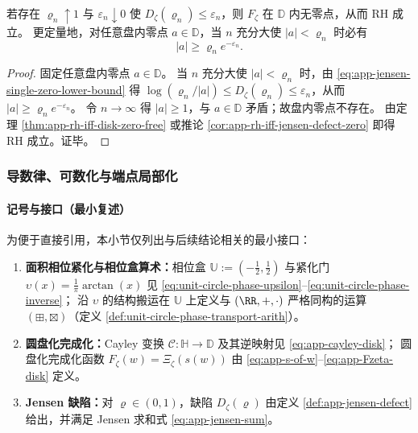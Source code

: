 \begin{corollary}[缺陷上界序列给出的零点排除证书]\label{cor:app-jensen-defect-upperbound-certificate}
若存在 \(\varrho_n\uparrow 1\) 与 \(\varepsilon_n\downarrow 0\) 使 \(D_{\zeta}(\varrho_n)\le \varepsilon_n\)，则 \(F_{\zeta}\) 在 \(\mathbb{D}\) 内无零点，从而 RH 成立。
更定量地，对任意盘内零点 \(a\in\mathbb{D}\)，当 \(n\) 充分大使 \(|a|<\varrho_n\) 时必有
\[
|a|\ge \varrho_n e^{-\varepsilon_n}.
\]
\end{corollary}
\begin{proof}
固定任意盘内零点 \(a\in\mathbb{D}\)。
当 \(n\) 充分大使 \(|a|<\varrho_n\) 时，由 \eqref{eq:app-jensen-single-zero-lower-bound} 得
\(
\log(\varrho_n/|a|)\le D_{\zeta}(\varrho_n)\le \varepsilon_n
\)，从而 \(|a|\ge \varrho_n e^{-\varepsilon_n}\)。
令 \(n\to\infty\) 得 \(|a|\ge 1\)，与 \(a\in\mathbb{D}\) 矛盾；故盘内零点不存在。
由定理 \ref{thm:app-rh-iff-disk-zero-free} 或推论 \ref{cor:app-rh-iff-jensen-defect-zero} 即得 RH 成立。证毕。
\end{proof}

\subsubsection{导数律、可数化与端点局部化}\label{subsubsec:app-jensen-defect-new-cluster}

\paragraph{记号与接口（最小复述）}
为便于直接引用，本小节仅列出与后续结论相关的最小接口：
\begin{enumerate}
  \item \textbf{面积相位紧化与相位盒算术：}相位盒 \(\mathbb{U}:=(-\tfrac12,\tfrac12)\) 与紧化门 \(\upsilon(x)=\frac{1}{\pi}\arctan(x)\) 见 \eqref{eq:unit-circle-phase-upsilon}--\eqref{eq:unit-circle-phase-inverse}；
  沿 \(\upsilon\) 的结构搬运在 \(\mathbb{U}\) 上定义与 \((\RR,+,\cdot)\) 严格同构的运算 \((\boxplus,\boxtimes)\)（定义 \ref{def:unit-circle-phase-transport-arith}）。
  \item \textbf{圆盘化完成化：}Cayley 变换 \(\mathcal{C}:\mathbb{H}\to\mathbb{D}\) 及其逆映射见 \eqref{eq:app-cayley-disk}；
  圆盘化完成化函数 \(F_{\zeta}(w)=\Xi_{\zeta}(s(w))\) 由 \eqref{eq:app-s-of-w}--\eqref{eq:app-Fzeta-disk} 定义。
  \item \textbf{Jensen 缺陷：}对 \(\varrho\in(0,1)\)，缺陷 \(D_{\zeta}(\varrho)\) 由定义 \ref{def:app-jensen-defect} 给出，并满足 Jensen 求和式 \eqref{eq:app-jensen-sum}。
\end{enumerate}

